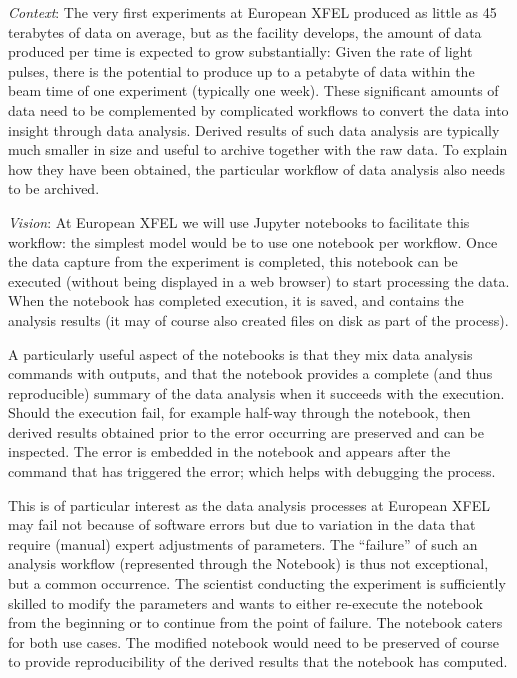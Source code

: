 \begin{task}[
  title=Reproducible X-ray crystallography workflows at European XFEL,
  id=reproducibility-xfel,
  lead=XFEL,
  PM=36,
  wphases={6-48},
  partners={}
  ]
  \medskip \emph{Context}: The very first experiments at European XFEL
  produced as little as 45 terabytes of data on average, but as the
  facility develops, the amount of data produced per time is expected
  to grow substantially: Given the rate of light pulses, there is the
  potential to produce up to a petabyte of data within the beam time
  of one experiment (typically one week). These significant amounts of
  data need to be complemented by complicated workflows to convert the
  data into insight through data analysis. Derived results of such
  data analysis are typically much smaller in size and useful to
  archive together with the raw data. To explain how they have been
  obtained, the particular workflow of data analysis also needs to be
  archived.

  \medskip \emph{Vision}: At European XFEL we will use Jupyter notebooks to facilitate
  this workflow: the simplest model would be to use one notebook per
  workflow. Once the data capture from the experiment is completed,
  this notebook can be executed (without being displayed in a web
  browser) to start processing the data. When the notebook has
  completed execution, it is saved, and contains the analysis results
  (it may of course also created files on disk as part of the
  process).

  A particularly useful aspect of the notebooks is that they mix data
  analysis commands with outputs, and that the notebook provides a
  complete (and thus reproducible) summary of the data analysis when
  it succeeds with the execution. Should the execution fail, for
  example half-way through the notebook, then derived results obtained
  prior to the error occurring are preserved and can be inspected. The
  error is embedded in the notebook and appears after the command that
  has triggered the error; which helps with debugging the process.

  This is of particular interest as the data analysis processes at
  European XFEL may fail not because of software errors but due to
  variation in the data that require (manual) expert adjustments of
  parameters. The ``failure'' of such an analysis workflow
  (represented through the Notebook) is thus not exceptional, but a
  common occurrence. The scientist conducting the experiment is
  sufficiently skilled to modify the parameters and wants to either
  re-execute the notebook from the beginning or to continue from the
  point of failure. The notebook caters for both use cases. The
  modified notebook would need to be preserved of course to provide
  reproducibility of the derived results that the notebook has
  computed.


\end{task}
